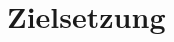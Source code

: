 
\chapter{Zielsetzung}
\label{chapter:zielsetzung}



\begin{otherlanguage}{american}









\end{otherlanguage}
